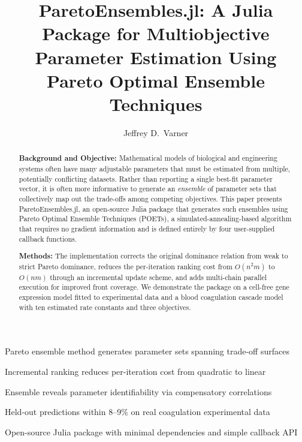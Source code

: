 \documentclass[preprint,review,12pt]{elsarticle}
\begin{document}
\begin{frontmatter}

\title{ParetoEnsembles.jl: A Julia Package for Multiobjective Parameter Estimation Using Pareto Optimal Ensemble Techniques}

\author[cornell]{Jeffrey D.\ Varner}
\address[cornell]{Robert Frederick Smith School of Chemical and Biomolecular Engineering, Cornell University, Ithaca, NY 14853, USA}

\begin{highlights}
\item Pareto ensemble method generates parameter sets spanning trade-off surfaces
\item Incremental ranking reduces per-iteration cost from quadratic to linear
\item Ensemble reveals parameter identifiability via compensatory correlations
\item Held-out predictions within 8--9\% on real coagulation experimental data
\item Open-source Julia package with minimal dependencies and simple callback API
\end{highlights}

\begin{abstract}
\textbf{Background and Objective:}
Mathematical models of biological and engineering systems often have many adjustable parameters that must be estimated from multiple, potentially conflicting datasets.
Rather than reporting a single best-fit parameter vector, it is often more informative to generate an \emph{ensemble} of parameter sets that collectively map out the trade-offs among competing objectives.
This paper presents ParetoEnsembles.jl, an open-source Julia package that generates such ensembles using Pareto Optimal Ensemble Techniques (POETs), a simulated-annealing-based algorithm that requires no gradient information and is defined entirely by four user-supplied callback functions.

\textbf{Methods:}
The implementation corrects the original dominance relation from weak to strict Pareto dominance, reduces the per-iteration ranking cost from $O(n^2 m)$ to $O(nm)$ through an incremental update scheme, and adds multi-chain parallel execution for improved front coverage.
We demonstrate the package on a cell-free gene expression model fitted to experimental data and a blood coagulation cascade model with ten estimated rate constants and three objectives.


\end{abstract}
\end{frontmatter}
\end{document}
